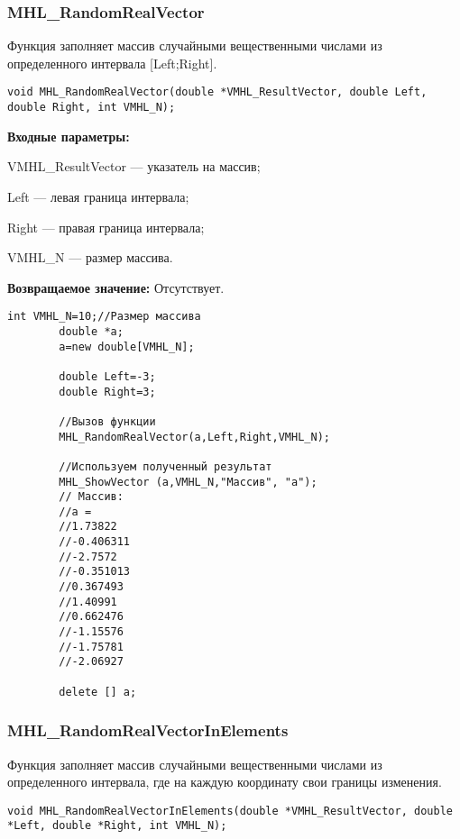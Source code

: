 \documentclass[a4paper,12pt]{article}
\begin{document}
\subsubsection{MHL\_RandomRealVector}\label{MHL_RandomRealVector}

Функция заполняет массив случайными вещественными числами из определенного интервала [Left;Right].


\begin{lstlisting}[label=code_syntax_MHL_RandomRealVector,caption=Синтаксис]
void MHL_RandomRealVector(double *VMHL_ResultVector, double Left, double Right, int VMHL_N);
\end{lstlisting}

\textbf{Входные параметры:}

 VMHL\_ResultVector --- указатель на массив;
 
 Left --- левая граница интервала;
 
 Right --- правая граница интервала;
 
 VMHL\_N --- размер массива.

\textbf{Возвращаемое значение:}
Отсутствует.


\begin{lstlisting}[label=code_use_MHL_RandomRealVector,caption=Пример использования]
        int VMHL_N=10;//Размер массива
        double *a;
        a=new double[VMHL_N];

        double Left=-3;
        double Right=3;

        //Вызов функции
        MHL_RandomRealVector(a,Left,Right,VMHL_N);

        //Используем полученный результат
        MHL_ShowVector (a,VMHL_N,"Массив", "a");
        // Массив:
        //a =
        //1.73822
        //-0.406311
        //-2.7572
        //-0.351013
        //0.367493
        //1.40991
        //0.662476
        //-1.15576
        //-1.75781
        //-2.06927

        delete [] a;
\end{lstlisting}

\subsubsection{MHL\_RandomRealVectorInElements}\label{MHL_RandomRealVectorInElements}

Функция заполняет массив случайными вещественными числами из определенного интервала, где на каждую координату свои границы изменения.


\begin{lstlisting}[label=code_syntax_MHL_RandomRealVectorInElements,caption=Синтаксис]
void MHL_RandomRealVectorInElements(double *VMHL_ResultVector, double *Left, double *Right, int VMHL_N);
\end{lstlisting}
\end{document}
